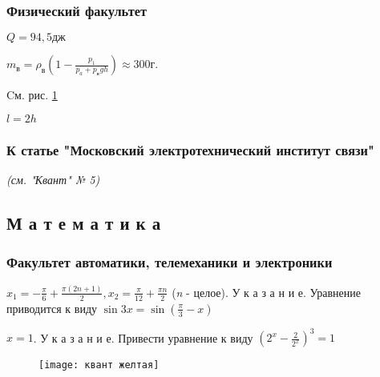 \subsubsection*{Физический факультет}

\begin{enums}
	\item $Q = 94,5\textit{дж}$
	\item \begin{math}
		m_\textit{в} = \rho_\textit{в} (1 - \frac{p_1}{p_a + p_\textit{в}gh})\approx 300 \textit{г.}
	\end{math}
	\item Cм. рис. \ref{Ris1}
	\item $l = 2h$
\end{enums}

\subsubsection*{К статье "Московский электротехнический институт связи"}
\begin{center}
	\textit{(см. "Квант" № 5)}
\end{center}

\subsection*{М а т е м а т и к а}
\subsubsection*{Факультет автоматики, телемеханики и электроники}

\begin{enums}
	\item \begin{math}
		x_1 = - \frac{\pi}{6} + \frac{\pi (2n + 1)}{2}, x_2 = \frac{\pi}{12} + \frac{\pi n}{2}
	\end{math}
	(\textit{n} - целое). У к а з а н и е. Уравнение приводится к виду \begin{math}
		\sin{3x} = \sin{(\frac{\pi}{3} - x)}
	\end{math}
	\item $x=1$. У к а з а н и е. Привести уравнение к виду $(2^x - \frac{2}{2^x})^3 = 1$
\end{enums}
\fontsize{5pt}{7pt}\selectfont
\begin{figure}[h]
	\centering
	\texttt{[image: квант желтая]}
	\vspace*{0pt}
	\caption{}\label{Ris1}
\end{figure}
\onecolumn